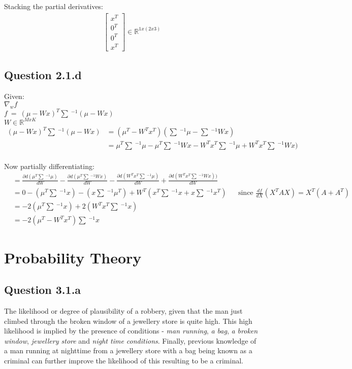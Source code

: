 \documentclass[a4paper]{article}
\begin{document}
Stacking the partial derivatives:
\begin{align*}
    \begin{bmatrix}
        x^T \\
        0^T \\
        0^T \\
        x^T
    \end{bmatrix} \in \mathbb{R}^{1x(2x3)}
\end{align*}{}
\bigskip

\subsection*{Question 2.1.d}
Given:\\
$\nabla_{w}f$ \\
$f\ =\ (\mu-Wx)^T\sum\ ^{-1}(\mu - Wx)$ \\
$W \in \mathbb{R}^{MxK}$ \\

\begin{align*}
    (\mu-Wx)^T\sum\ ^{-1}(\mu - Wx) &= (\mu^T-W^Tx^T)(\sum\ ^{-1}\mu - \sum\ ^{-1} Wx)\\
    &= \mu^T\sum\ ^{-1}\mu - \mu^T\sum\ ^{-1}Wx - W^Tx^T\sum\ ^{-1}\mu + W^Tx^T \sum\ ^{-1} Wx)\\
\end{align*}{}

Now partially differentiating:
\begin{align*}
   &= \frac{\partial d(\mu^T\sum\ ^{-1}\mu)}{dW} - \frac{\partial d(\mu^T\sum\ ^{-1}Wx)}{dW} - \frac{\partial d(W^Tx^T\sum\ ^{-1}\mu)}{dW} + \frac{\partial d(W^Tx^T \sum\ ^{-1} Wx))}{dW} \\
   &= 0 - (\mu^T\sum\ ^{-1}x) - (x\sum\ ^{-1}\mu^T) + W^T(x^T\sum\ ^{-1}x + x\sum\ ^{-1}x^T) && \text{since\ } \frac{df}{dX}(X^TAX) = X^T(A+A^T) \\
   &= -2(\mu^T\sum\ ^{-1}x) + 2(W^Tx^T\sum\ ^{-1}x) \\
   &= -2(\mu^T - W^Tx^T)\sum\ ^{-1}x
\end{align*}{}





\section*{Probability Theory}
\subsection*{Question 3.1.a}
The likelihood or degree of plausibility of a robbery, given that the man just climbed through the broken window of a jewellery store is quite high. This high likelihood is implied by the presence of conditions - \textit{man running}, \textit{a bag}, \textit{a broken window},  \textit{jewellery store} and \textit{night time conditions}. Finally, previous knowledge of a man running at nighttime from a jewellery store with a bag being known as a criminal can further improve the likelihood of this resulting to be a criminal.
\end{document}
